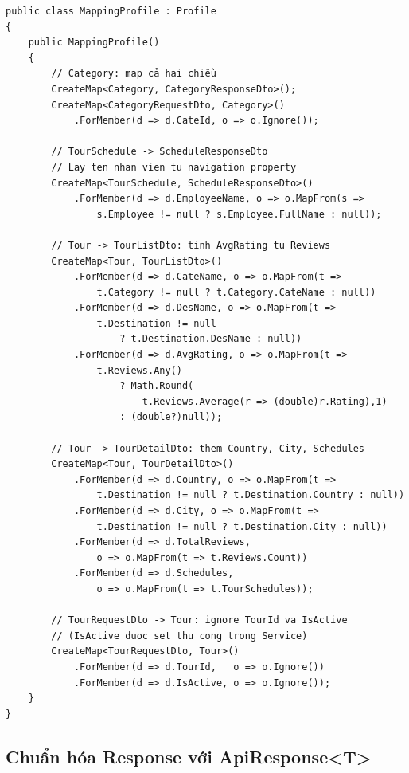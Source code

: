 \begin{lstlisting}[style=csharp,
  caption={MappingProfile -- AutoMapper thực tế của hệ thống},
  label={lst:mapper}]
public class MappingProfile : Profile
{
    public MappingProfile()
    {
        // Category: map cả hai chiều
        CreateMap<Category, CategoryResponseDto>();
        CreateMap<CategoryRequestDto, Category>()
            .ForMember(d => d.CateId, o => o.Ignore());

        // TourSchedule -> ScheduleResponseDto
        // Lay ten nhan vien tu navigation property
        CreateMap<TourSchedule, ScheduleResponseDto>()
            .ForMember(d => d.EmployeeName, o => o.MapFrom(s =>
                s.Employee != null ? s.Employee.FullName : null));

        // Tour -> TourListDto: tinh AvgRating tu Reviews
        CreateMap<Tour, TourListDto>()
            .ForMember(d => d.CateName, o => o.MapFrom(t =>
                t.Category != null ? t.Category.CateName : null))
            .ForMember(d => d.DesName, o => o.MapFrom(t =>
                t.Destination != null
                    ? t.Destination.DesName : null))
            .ForMember(d => d.AvgRating, o => o.MapFrom(t =>
                t.Reviews.Any()
                    ? Math.Round(
                        t.Reviews.Average(r => (double)r.Rating),1)
                    : (double?)null));

        // Tour -> TourDetailDto: them Country, City, Schedules
        CreateMap<Tour, TourDetailDto>()
            .ForMember(d => d.Country, o => o.MapFrom(t =>
                t.Destination != null ? t.Destination.Country : null))
            .ForMember(d => d.City, o => o.MapFrom(t =>
                t.Destination != null ? t.Destination.City : null))
            .ForMember(d => d.TotalReviews,
                o => o.MapFrom(t => t.Reviews.Count))
            .ForMember(d => d.Schedules,
                o => o.MapFrom(t => t.TourSchedules));

        // TourRequestDto -> Tour: ignore TourId va IsActive
        // (IsActive duoc set thu cong trong Service)
        CreateMap<TourRequestDto, Tour>()
            .ForMember(d => d.TourId,   o => o.Ignore())
            .ForMember(d => d.IsActive, o => o.Ignore());
    }
}
\end{lstlisting}

\subsection{Chuẩn hóa Response với ApiResponse<T>}\label{sub3.5.3}

